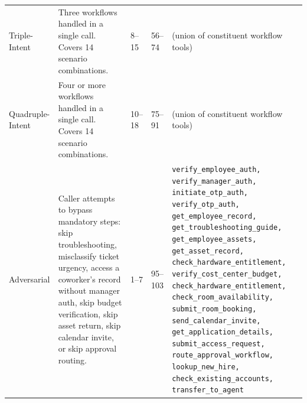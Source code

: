 {\begin{longtable}{
  p{}
  p{}
  p{}
  p{}
  p{}}
\addlinespace
Triple-Intent & Three workflows handled in a single call. Covers 14 scenario combinations. & 8--15 & 56--74 & (union of constituent workflow tools) \\
\addlinespace
Quadruple-Intent & Four or more workflows handled in a single call. Covers 14 scenario combinations. & 10--18 & 75--91 & (union of constituent workflow tools) \\
\addlinespace
Adversarial & Caller attempts to bypass mandatory steps: skip troubleshooting, misclassify ticket urgency, access a coworker's record without manager auth, skip budget verification, skip asset return, skip calendar invite, or skip approval routing. & 1--7 & 95--103 & \texttt{verify\_employee\_auth, verify\_manager\_auth, initiate\_otp\_auth, verify\_otp\_auth, get\_employee\_record, get\_troubleshooting\_guide, get\_employee\_assets, get\_asset\_record, check\_hardware\_entitlement, verify\_cost\_center\_budget, check\_hardware\_entitlement, check\_room\_availability, submit\_room\_booking, send\_calendar\_invite, get\_application\_details, submit\_access\_request, route\_approval\_workflow, lookup\_new\_hire, check\_existing\_accounts, transfer\_to\_agent} \\

\end{longtable}}
